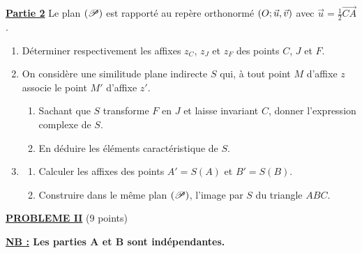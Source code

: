       \underline{\textbf{Partie 2}} \newline
            Le plan $(\mathscr{P})$ est rapport\'e au rep\`ere orthonorm\'e $(O;\vec{u},\vec{v})$ avec $\vec{u} = \frac{1}{2} \overrightarrow{CA}$.
            \begin{enumerate}
                  \item D\'eterminer respectivement les affixes $z_C$, $z_J$ et $z_F$ des points $C$, $J$ et $F$.
                  \item On consid\`ere une similitude plane indirecte $S$ qui, \`a tout point $M$ d'affixe $z$ associe
                        le point $M'$ d'affixe $z'$.
                        \begin{enumerate}
                              \item Sachant que $S$ transforme $F$ en $J$ et laisse invariant $C$, 
                                    donner l'expression complexe de $S$.
                              \item En d\'eduire les \'el\'ements caract\'eristique de $S$.
                        \end{enumerate}
                  \item \begin{enumerate}
                              \item Calculer les affixes des points $A' = S(A)$ et $B' = S(B)$.
                              \item Construire dans le m\^eme plan $(\mathscr{P})$, l'image par $S$ du triangle $ABC$.
                        \end{enumerate}
            \end{enumerate}
\noindent \underline{\textsc{\textbf{PROBLEME II}}} (9 points) 
      \begin{center}
            \textbf{\underline{NB :} Les parties A et B sont ind\'ependantes.}
      \end{center}
